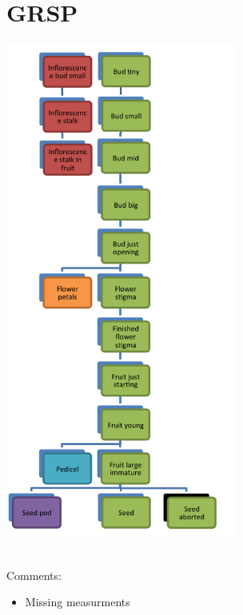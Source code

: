 \documentclass[10pt]{book} %
\begin{document}
\section{GRSP}
\begin{multicols}{2}
\includegraphics[width=3in]{GRSP.png}
\vfill
\columnbreak


\\Comments:
\begin{itemize}
\item Missing measurments
\end{itemize}

\end{multicols}




\clearpage
\newpage
\end{document}
